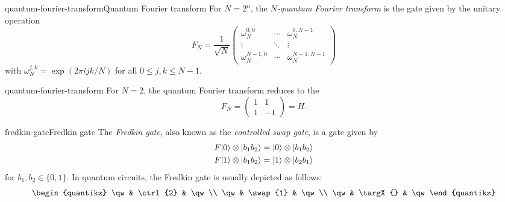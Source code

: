 \begin{topic}{quantum-fourier-transform}{Quantum Fourier transform}
    For $N = 2^n$, the \emph{$N$-quantum Fourier transform} is the  gate given by the unitary operation
    \[ F_N = \frac{1}{\sqrt{N}} \begin{pmatrix}
        \omega_N^{0, 0} & \cdots & \omega_N^{0, N - 1} \\
        \vdots & \ddots & \vdots \\
        \omega_N^{N - 1, 0} & \cdots & \omega_N^{N - 1, N - 1}
    \end{pmatrix} \]
    with $\omega_N^{j, k} = \exp(2 \pi i j k / N)$ for all $0 \le j, k \le N - 1$.
\end{topic}

\begin{example}{quantum-fourier-transform}
    For $N = 2$, the quantum Fourier transform reduces to the 
    \[ F_N = \begin{pmatrix} 1 & 1 \\ 1 & -1 \end{pmatrix} = H . \]
\end{example}

\begin{topic}{fredkin-gate}{Fredkin gate}
    The \emph{Fredkin gate}, also known as the \emph{controlled swap gate}, is a  gate given by
    \[ \begin{aligned}
        F |0\rangle \otimes |b_1 b_2\rangle &= |0\rangle \otimes |b_1 b_2\rangle \\
        F |1\rangle \otimes |b_1 b_2\rangle &= |1\rangle \otimes |b_2 b_1\rangle
    \end{aligned} \]
    for $b_1, b_2 \in \{ 0, 1 \}$. In quantum circuits, the Fredkin gate is usually depicted as follows:
    \[ \svg \begin{quantikz}
        \qw & \ctrl{2} & \qw \\
        \qw & \swap{1} & \qw \\
        \qw & \targX{} & \qw
    \end{quantikz} \]
\end{topic}

